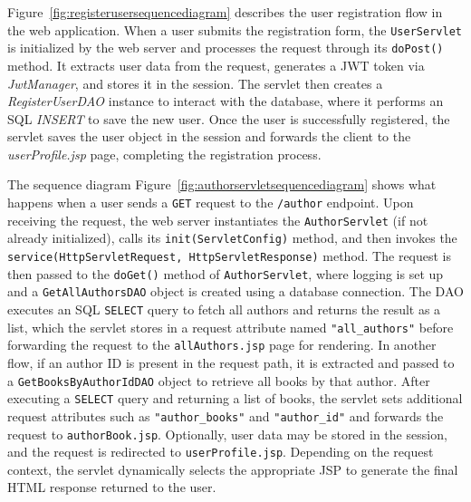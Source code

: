 Figure~\ref{fig:registerusersequencediagram} describes the user registration flow in the web application. When a user submits the registration form, the \texttt{UserServlet}  is initialized by the web server and processes the request through its \texttt{doPost()} method. It extracts user data from the request, generates a JWT token via \textit{JwtManager}, and stores it in the session. The servlet then creates a \textit{RegisterUserDAO} instance to interact with the database, where it performs an SQL \textit{INSERT} to save the new user. Once the user is successfully registered, the servlet saves the user object in the session and forwards the client to the \textit{userProfile.jsp} page, completing the registration process.
\bigskip

The sequence diagram Figure~\ref{fig:authorservletsequencediagram} shows what happens when a user sends a \texttt{GET} request to the \texttt{/author} endpoint. Upon receiving the request, the web server instantiates the \texttt{AuthorServlet} (if not already initialized), calls its \texttt{init(ServletConfig)} method, and then invokes the \texttt{service(HttpServletRequest, HttpServletResponse)} method. The request is then passed to the \texttt{doGet()} method of \texttt{AuthorServlet}, where logging is set up and a \texttt{GetAllAuthorsDAO} object is created using a database connection. The DAO executes an SQL \texttt{SELECT} query to fetch all authors and returns the result as a list, which the servlet stores in a request attribute named \texttt{"all\_authors"} before forwarding the request to the \texttt{allAuthors.jsp} page for rendering. In another flow, if an author ID is present in the request path, it is extracted and passed to a \texttt{GetBooksByAuthorIdDAO} object to retrieve all books by that author. After executing a \texttt{SELECT} query and returning a list of books, the servlet sets additional request attributes such as \texttt{"author\_books"} and \texttt{"author\_id"} and forwards the request to \texttt{authorBook.jsp}. Optionally, user data may be stored in the session, and the request is redirected to \texttt{userProfile.jsp}. Depending on the request context, the servlet dynamically selects the appropriate JSP to generate the final HTML response returned to the user.



